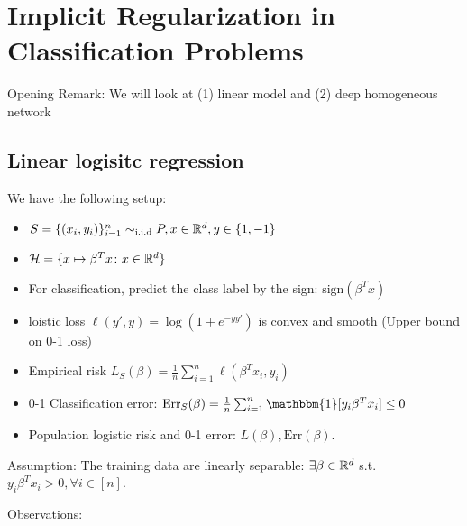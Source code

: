 

\chapter{Implicit Regularization in Classification Problems}


Opening Remark: We will look at (1) linear model and (2) deep homogeneous network 


\section{Linear logisitc regression}



We have the following setup: 

\begin{itemize}
    \item \(S = \{ (x_i, y_i)\}_{i=1}^n \sim_{\text{i.i.d}} P, x \in \mathbb{R}^d, y \in \{1, -1\}\)
    \item   \( \mathcal{H} = \{ x \mapsto \beta^T x \colon x \in \mathbb{R}^d\}\)
    \item For classification, predict the class label by the sign: \(\text{sign}(\beta^T x)\)
    \item loistic loss \(\ell (y', y) = \log \left( 1 + e^{-y y'}\right)\) is convex and smooth (Upper bound on 0-1 loss)
    \item Empirical risk \(L_S (\beta) = \frac{1}{n}\sum_{i=1}^n \ell\left(\beta^T x_i, y_i\right)\)
    \item 0-1 Classification error: \(\text{Err}_S (\beta) = \frac{1}{n} \sum_{i=1}^n \mathbbm{1} [y_i 
    \beta^T x_i] \leq 0 \)
    \item Population logistic risk and 0-1 error: \(L(\beta), \text{Err}(\beta)\).  
\end{itemize}

Assumption: The training data are linearly separable: \(\exists \beta \in \mathbb{R}^d\) s.t. 
\(y_i\beta^T x_i > 0, \forall i \in [n]\). 


Observations: 

